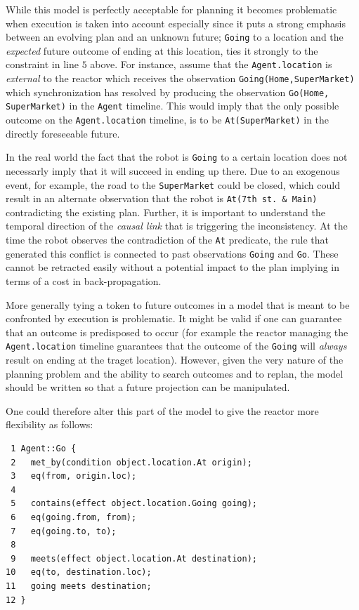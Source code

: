 While this model is perfectly acceptable for planning it becomes
problematic when execution is taken into account especially since it
puts a strong emphasis between an evolving plan and an unknown future;
\texttt{Going} to a location and the {\em expected} future outcome of
ending at this location, ties it strongly to the constraint in line
$5$ above. For instance, assume that the \texttt{Agent.location} is
{\em external} to the reactor which receives the observation
\texttt{Going(Home,SuperMarket)} which synchronization has resolved by
producing the observation \texttt{Go(Home, SuperMarket)} in the
\texttt{Agent} timeline. This would imply that the only possible
outcome on the \texttt{Agent.location} timeline, is to be
\texttt{At(SuperMarket)} in the directly foreseeable future. 

In the real world the fact that the robot is \texttt{Going} to a
certain location does not necessarly imply that it will succeed in
ending up there. Due to an exogenous event, for example, the road to
the \texttt{SuperMarket} could be closed, which could result in an
alternate observation that the robot is \texttt{At(7th st. \& Main)}
contradicting the existing plan. Further, it is important to
understand the temporal direction of the \emph{causal link} that is
triggering the inconsistency. At the time the robot observes the
contradiction of the \texttt{At} predicate, the rule that generated
this conflict is connected to past observations \texttt{Going} and
\texttt{Go}. These cannot be retracted easily without a potential
impact to the plan implying in terms of a cost in back-propagation.

More generally tying a token to future outcomes in a model that is
meant to be confronted by execution is problematic. It might be valid
if one can guarantee that an outcome is predisposed to occur (for
example the reactor managing the \texttt{Agent.location} timeline
guarantees that the outcome of the \texttt{Going} will {\em always}
result on ending at the traget location). However, given the very
nature of the planning problem and the ability to search outcomes and
to replan, the model should be written so that a future projection can
be manipulated. 

One could therefore alter this part of the model to give the reactor
more flexibility as follows:

\begin{verbatim}
 1 Agent::Go {
 2   met_by(condition object.location.At origin);
 3   eq(from, origin.loc);
 4
 5   contains(effect object.location.Going going);
 6   eq(going.from, from);
 7   eq(going.to, to);
 8   
 9   meets(effect object.location.At destination);
10   eq(to, destination.loc);
11   going meets destination;
12 }
\end{verbatim}

